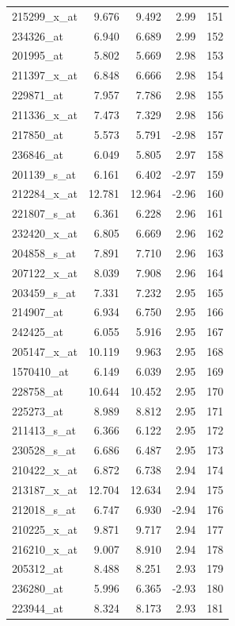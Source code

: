 \begin{footnotesize}
\begin{longtable}{lrrrr}
215299\_x\_at & 9.676 & 9.492 & 2.99 & 151 \\
234326\_at & 6.940 & 6.689 & 2.99 & 152 \\
201995\_at & 5.802 & 5.669 & 2.98 & 153 \\
211397\_x\_at & 6.848 & 6.666 & 2.98 & 154 \\
229871\_at & 7.957 & 7.786 & 2.98 & 155 \\
211336\_x\_at & 7.473 & 7.329 & 2.98 & 156 \\
217850\_at & 5.573 & 5.791 & -2.98 & 157 \\
236846\_at & 6.049 & 5.805 & 2.97 & 158 \\
201139\_s\_at & 6.161 & 6.402 & -2.97 & 159 \\
212284\_x\_at & 12.781 & 12.964 & -2.96 & 160 \\
221807\_s\_at & 6.361 & 6.228 & 2.96 & 161 \\
232420\_x\_at & 6.805 & 6.669 & 2.96 & 162 \\
204858\_s\_at & 7.891 & 7.710 & 2.96 & 163 \\
207122\_x\_at & 8.039 & 7.908 & 2.96 & 164 \\
203459\_s\_at & 7.331 & 7.232 & 2.95 & 165 \\
214907\_at & 6.934 & 6.750 & 2.95 & 166 \\
242425\_at & 6.055 & 5.916 & 2.95 & 167 \\
205147\_x\_at & 10.119 & 9.963 & 2.95 & 168 \\
1570410\_at & 6.149 & 6.039 & 2.95 & 169 \\
228758\_at & 10.644 & 10.452 & 2.95 & 170 \\
225273\_at & 8.989 & 8.812 & 2.95 & 171 \\
211413\_s\_at & 6.366 & 6.122 & 2.95 & 172 \\
230528\_s\_at & 6.686 & 6.487 & 2.95 & 173 \\
210422\_x\_at & 6.872 & 6.738 & 2.94 & 174 \\
213187\_x\_at & 12.704 & 12.634 & 2.94 & 175 \\
212018\_s\_at & 6.747 & 6.930 & -2.94 & 176 \\
210225\_x\_at & 9.871 & 9.717 & 2.94 & 177 \\
216210\_x\_at & 9.007 & 8.910 & 2.94 & 178 \\
205312\_at & 8.488 & 8.251 & 2.93 & 179 \\
236280\_at & 5.996 & 6.365 & -2.93 & 180 \\
223944\_at & 8.324 & 8.173 & 2.93 & 181 \\

\end{longtable}
\end{footnotesize}
